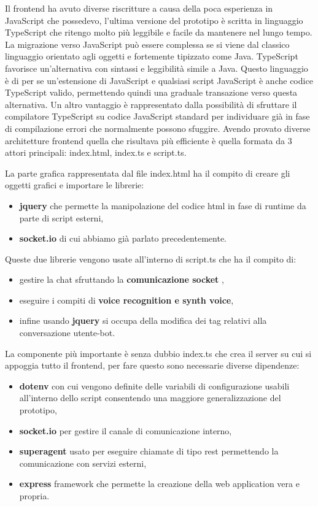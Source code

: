 Il frontend ha avuto diverse riscritture a causa della poca esperienza in JavaScript che possedevo, l'ultima versione del prototipo è scritta in linguaggio TypeScript che ritengo molto più leggibile e facile da mantenere nel lungo tempo.
La migrazione verso JavaScript può essere complessa se si viene dal classico linguaggio orientato agli oggetti e fortemente tipizzato come Java.
TypeScript favorisce un'alternativa con sintassi e leggibilità simile a Java.
Questo linguaggio è di per se un'estensione di JavaScript e qualsiasi script JavaScript è anche codice TypeScript valido, permettendo quindi una graduale transazione verso questa alternativa.
Un altro vantaggio è rappresentato dalla possibilità di sfruttare il compilatore TypeScript su codice JavaScript standard per individuare già in fase di compilazione errori che normalmente possono sfuggire.
Avendo provato diverse architetture frontend quella che risultava più efficiente è quella formata da 3 attori principali: index.html, index.ts e script.ts.

La parte grafica rappresentata dal file index.html ha il compito di creare gli oggetti grafici e importare le librerie:
\begin{itemize}
\item \textbf{jquery} che permette la manipolazione del codice html in fase di runtime da parte di script esterni,
\item \textbf{socket.io} di cui abbiamo già parlato precedentemente.
\end{itemize}
Queste due librerie vengono usate all'interno di script.ts che ha il compito di:
\begin{itemize}
\item gestire la chat sfruttando la \textbf{comunicazione socket} ,
\item eseguire i compiti di \textbf{voice recognition e synth voice},
\item infine usando \textbf{jquery} si occupa della modifica dei tag relativi alla conversazione utente-bot.
\end{itemize}
La componente più importante è senza dubbio index.ts che crea il server su cui si appoggia tutto il frontend, per fare questo sono necessarie diverse dipendenze:
\begin{itemize}
\item \textbf{dotenv} con cui vengono definite delle variabili di configurazione usabili all'interno dello script consentendo una maggiore generalizzazione del prototipo,
\item \textbf{socket.io} per gestire il canale di comunicazione interno,
\item \textbf{superagent} usato per eseguire chiamate di tipo rest permettendo la comunicazione con servizi esterni,
\item  \textbf{express} framework che permette la creazione della web application vera e propria.
\end{itemize}

